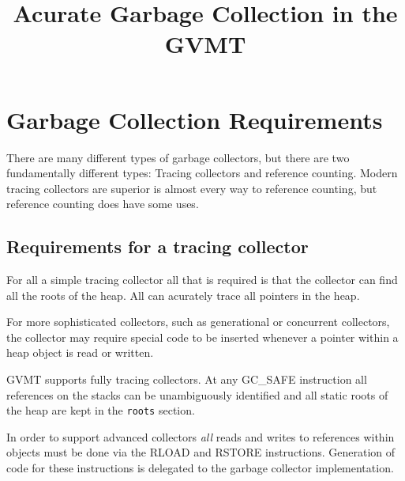\documentclass[a4paper,10pt]{article}
\title{Acurate Garbage Collection in the GVMT}
\author{}
\begin{document}
\maketitle

\begin{abstract}

\end{abstract}

\section{Garbage Collection Requirements}
There are many different types of garbage collectors, but there are two fundamentally different types: Tracing collectors and reference counting.
Modern tracing collectors are superior is almost every way to reference counting, but reference counting does have some uses.

\subsection{Requirements for a tracing collector}
For all a simple tracing collector all that is required is that the collector can find all the roots of the heap. All can acurately trace all pointers in the heap.

For more sophisticated collectors, such as generational or concurrent collectors, the collector may require special code to be inserted whenever a pointer within a heap object is read or written.

GVMT supports fully tracing collectors. At any GC\_SAFE instruction all references on the stacks can be unambiguously identified and all static roots of the heap are kept in the \verb|roots| section.

In order to support advanced collectors \emph{all} reads and writes to references within objects must be done via the RLOAD and RSTORE instructions. Generation of code for these instructions is delegated to the garbage collector implementation. 
\end{document}
